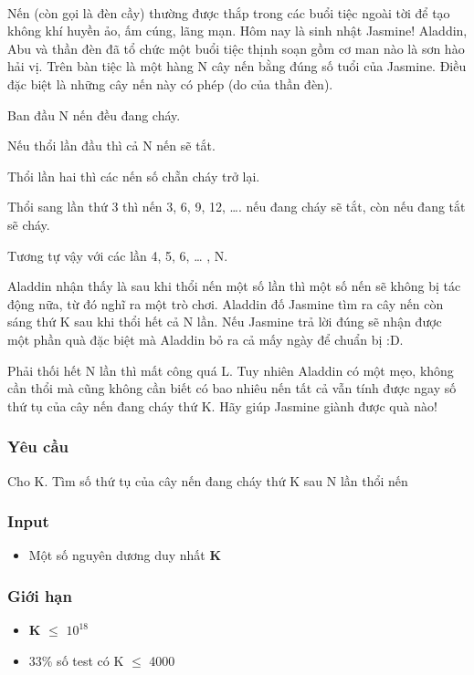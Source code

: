 

 

Nến (còn gọi là đèn cầy) thường được thắp trong các buổi tiệc ngoài tời để tạo không khí huyền ảo, ấm cúng, lãng mạn. Hôm nay là sinh nhật Jasmine! Aladdin, Abu và thần đèn đã tổ chức một buổi tiệc thịnh soạn gồm cơ man nào là sơn hào hải vị. Trên bàn tiệc là một hàng N cây nến bằng đúng số tuổi của Jasmine. Điều đặc biệt là những cây nến này có phép (do của thần đèn).

Ban đầu N nến đều đang cháy.

Nếu thổi lần đầu thì cả N nến sẽ tắt.

Thổi lần hai thì các nến số chẵn cháy trở lại.

Thổi sang lần thứ 3 thì nến 3, 6, 9, 12, …. nếu đang cháy sẽ tắt, còn nếu đang tắt sẽ cháy.

Tương tự vậy với các lần 4, 5, 6, … , N.

Aladdin nhận thấy là sau khi thổi nến một số lần thì một số nến sẽ không bị tác động nữa, từ đó nghĩ ra một trò chơi. Aladdin đố Jasmine tìm ra cây nến còn sáng thứ K sau khi thổi hết cả N lần. Nếu Jasmine trả lời đúng sẽ nhận được một phần quà đặc biệt mà Aladdin bỏ ra cả mấy ngày để chuẩn bị :D.

Phải thối hết N lần thì mất công quá L. Tuy nhiên Aladdin có một mẹo, không cần thổi mà cũng không cần biết có bao nhiêu nến tất cả vẫn tính được ngay số thứ tụ của cây nến đang cháy thứ K. Hãy giúp Jasmine giành được quà nào!

\subsubsection{Yêu cầu}

Cho K. Tìm số thứ tụ của cây nến đang cháy thứ K sau N lần thổi nến

\subsubsection{Input}
\begin{itemize}
	\item Một số nguyên dương duy nhất \textbf{ K }
\end{itemize}

\subsubsection{Giới hạn}
\begin{itemize}
	\item \textbf{K }  $\le$  $10^{18}$
	\item 33\% số test có K  $\le$  4000
\end{itemize}

